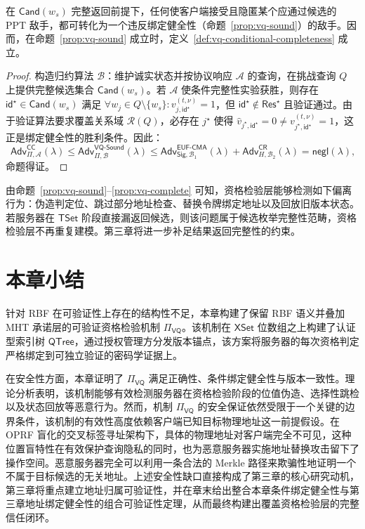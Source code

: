 \begin{proposition}[条件完整性]\label{prop:vq-complete}
在 $\mathsf{Cand}(w_s)$ 完整返回前提下，任何使客户端接受且隐匿某个应通过候选的 PPT 敌手，都可转化为一个违反绑定健全性（命题~\ref{prop:vq-sound}）的敌手。因而，在命题~\ref{prop:vq-sound} 成立时，定义~\ref{def:vq-conditional-completeness} 成立。
\end{proposition}

\begin{proof}
构造归约算法 $\mathcal{B}$：维护诚实状态并按协议响应 $\mathcal{A}$ 的查询，在挑战查询 $Q$ 上提供完整候选集合 $\mathsf{Cand}(w_s)$。若 $\mathcal{A}$ 使条件完整性实验获胜，则存在 $\mathsf{id}^\star\in\mathsf{Cand}(w_s)$ 满足 $\forall w_j\in Q\setminus\{w_s\}:v_{j,\mathsf{id}^\star}^{(t,\nu)}=1$，但 $\mathsf{id}^\star\notin\mathsf{Res}^\star$ 且验证通过。由于验证算法要求覆盖关系域 $\mathcal{R}(Q)$，必存在 $j^\star$ 使得 $\widehat{v}_{j^\star,\mathsf{id}^\star}=0\neq v_{j^\star,\mathsf{id}^\star}^{(t,\nu)}=1$，这正是绑定健全性的胜利条件。因此：
\begin{equation}
\mathsf{Adv}_{\Pi,\mathcal{A}}^{\mathsf{CC}}(\lambda)\le\mathsf{Adv}_{\Pi,\mathcal{B}}^{\mathsf{VQ\text{-}Sound}}(\lambda)\le\mathsf{Adv}_{\mathsf{Sig},\mathcal{B}_1}^{\mathsf{EUF\text{-}CMA}}(\lambda)+\mathsf{Adv}_{H,\mathcal{B}_2}^{\mathsf{CR}}(\lambda)=\mathsf{negl}(\lambda)\text{,}
\end{equation}
命题得证。
\end{proof}

由命题~\ref{prop:vq-sound}--\ref{prop:vq-complete} 可知，资格检验层能够检测如下偏离行为：伪造判定位、跳过部分地址检查、替换令牌绑定地址以及回放旧版本状态。若服务器在 $\mathsf{TSet}$ 阶段直接漏返回候选，则该问题属于候选枚举完整性范畴，资格检验层不再重复建模。第三章将进一步补足结果返回完整性的约束。

\section{本章小结}
针对 RBF 在可验证性上存在的结构性不足，本章构建了保留 RBF 语义并叠加 MHT 承诺层的可验证资格检验机制 $\Pi_{\mathsf{VQ}}$。该机制在 $\mathsf{XSet}$ 位数组之上构建了认证型索引树 $\mathsf{QTree}$，通过授权管理方分发版本锚点，该方案将服务器的每次资格判定严格绑定到可独立验证的密码学证据上。

在安全性方面，本章证明了 $\Pi_{\mathsf{VQ}}$ 满足正确性、条件绑定健全性与版本一致性。理论分析表明，该机制能够有效检测服务器在资格检验阶段的位值伪造、选择性跳检以及状态回放等恶意行为。然而，机制 $\Pi_{\mathsf{VQ}}$ 的安全保证依然受限于一个关键的边界条件，该机制的有效性高度依赖客户端已知目标物理地址这一前提假设。在 OPRF 盲化的交叉标签寻址架构下，具体的物理地址对客户端完全不可见，这种位置盲特性在有效保护查询隐私的同时，也为恶意服务器实施地址替换攻击留下了操作空间。恶意服务器完全可以利用一条合法的 Merkle 路径来欺骗性地证明一个不属于目标候选的无关地址。上述安全性缺口直接构成了第三章的核心研究动机，第三章将重点建立地址归属可验证性，并在章末给出整合本章条件绑定健全性与第三章地址绑定健全性的组合可验证性定理，从而最终构建出覆盖资格检验层的完整信任闭环。
